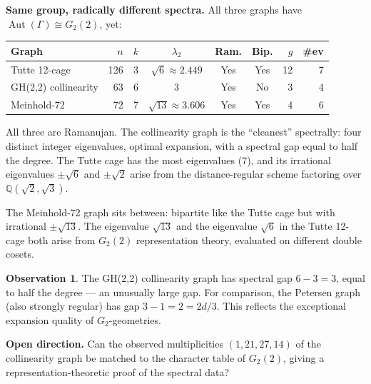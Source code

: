 \documentclass[11pt,a4paper]{article}
\theoremstyle{plain}
\theoremstyle{definition}
\newtheorem{observation}[theorem]{Observation}
\theoremstyle{remark}
\newcommand{\Q}{\mathbb{Q}}
\newcommand{\Aut}{\operatorname{Aut}}
\begin{document}
\begin{tcolorbox}[breakable, colback=yellow!10, colframe=yellow!10,
  boxrule=0pt, sharp corners]
\textbf{Same group, radically different spectra.}
All three graphs have $\Aut(\Gamma) \cong G_2(2)$, yet:
\begin{center}
\small
\begin{tabular}{@{}lrrcccrr@{}}
\toprule
Graph & $n$ & $k$ & $\lambda_2$ & Ram. & Bip. & $g$ & \#ev \\
\midrule
Tutte 12-cage        & 126 & 3 & $\sqrt{6}\approx 2.449$ & Yes & Yes & 12 & 7 \\
GH(2,2) collinearity & 63  & 6 & $3$                     & Yes & No  &  3 & 4 \\
Meinhold-72          & 72  & 7 & $\sqrt{13}\approx 3.606$ & Yes & Yes &  4 & 6 \\
\bottomrule
\end{tabular}
\end{center}
All three are Ramanujan. The collinearity graph is the ``cleanest'' spectrally:
four distinct integer eigenvalues, optimal expansion, with a spectral gap
equal to half the degree. The Tutte cage has the most eigenvalues (7), and
its irrational eigenvalues $\pm\sqrt{6}$ and $\pm\sqrt{2}$ arise from the
distance-regular scheme factoring over $\Q(\sqrt{2}, \sqrt{3})$.

The Meinhold-72 graph sits between: bipartite like the Tutte cage but with
irrational $\pm\sqrt{13}$. The eigenvalue $\sqrt{13}$ and the eigenvalue
$\sqrt{6}$ in the Tutte 12-cage both arise from $G_2(2)$ representation
theory, evaluated on different double cosets.
\end{tcolorbox}

\begin{tcolorbox}[colback=black!5, colframe=black!5,
  boxrule=0pt, sharp corners]
\begin{observation}
The GH(2,2) collinearity graph has spectral gap $6 - 3 = 3$, equal to
half the degree --- an unusually large gap. For comparison, the Petersen
graph (also strongly regular) has gap $3 - 1 = 2 = 2d/3$. This reflects the
exceptional expansion quality of $G_2$-geometries.
\end{observation}
\end{tcolorbox}

\begin{tcolorbox}[colback=blue!5, colframe=blue!5,
  boxrule=0pt, sharp corners]
\textbf{Open direction.}
Can the observed multiplicities $(1, 21, 27, 14)$ of the collinearity graph
be matched to the character table of $G_2(2)$, giving a representation-theoretic
proof of the spectral data?
\end{tcolorbox}
\end{document}
